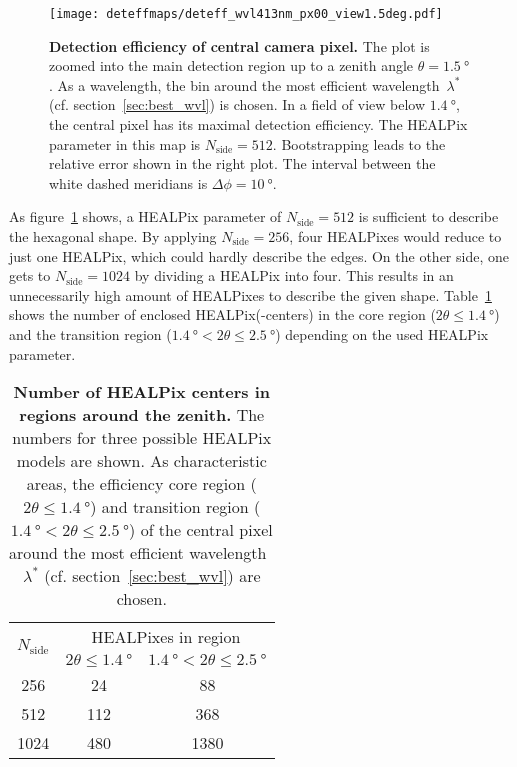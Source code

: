 \begin{figure}[H]
	\centering
	\texttt{[image: deteffmaps/deteff\_wvl413nm\_px00\_view1.5deg.pdf]}
	\caption[Detection efficiency of central camera pixel]{\textbf{Detection efficiency of central camera pixel.} The plot is zoomed into the main detection region up to a zenith angle $\theta=\SI{1.5}{\degree}$. As a wavelength, the bin around the most efficient wavelength~$\lambda^\ast$ (cf. section~\ref{sec:best_wvl}) is chosen. In a field of view below $\SI{1.4}{\degree}$, the central pixel has its maximal detection efficiency. The HEALPix parameter in this map is $N_\text{side}=\num{512}$. Bootstrapping leads to the relative error shown in the right plot. The interval between the white dashed meridians is $\Delta\phi=\SI{10}{\degree}$.}
	\label{deteffmap:px0}
\end{figure}

As figure~\ref{deteffmap:px0} shows, a HEALPix parameter of $N_\text{side}=\num{512}$ is sufficient to describe the hexagonal shape. By applying $N_\text{side}=\num{256}$, four HEALPixes would reduce to just one HEALPix, which could hardly describe the edges. On the other side, one gets to $N_\text{side}=\num{1024}$ by dividing a HEALPix into four. This results in an unnecessarily high amount of HEALPixes to describe the given shape. Table~\ref{n_healpix_fov} shows the number of enclosed HEALPix(-centers) in the core region ($2\theta\leq\SI{1.4}{\degree}$) and the transition region ($\SI{1.4}{\degree} < 2\theta \leq \SI{2.5}{\degree}$) depending on the used HEALPix parameter.

\begin{table}[H]
	\centering
	\begin{tabular}{c|c|c}
		\toprule
		\multirow{2}{*}{$N_\text{side}$} & \multicolumn{2}{c}{HEALPixes in region} \\
		&	$2\theta\leq\SI{1.4}{\degree}$ & $\SI{1.4}{\degree} < 2\theta \leq \SI{2.5}{\degree}$ \\
		\midrule
		\num{256}  & \num{24}  & \num{88} \\
		\num{512}  & \num{112} & \num{368} \\
		\num{1024} & \num{480} & \num{1380} \\
		\bottomrule
	\end{tabular}
	\caption[Number of HEALPix centers in regions around the zenith]{\textbf{Number of HEALPix centers in regions around the zenith.} The numbers for three possible HEALPix models are shown. As characteristic areas, the efficiency core region ($2\theta\leq\SI{1.4}{\degree}$) and transition region ($\SI{1.4}{\degree} < 2\theta \leq \SI{2.5}{\degree}$) of the central pixel around the most efficient wavelength~$\lambda^\ast$ (cf. section~\ref{sec:best_wvl}) are chosen.}
	\label{n_healpix_fov}
\end{table}

